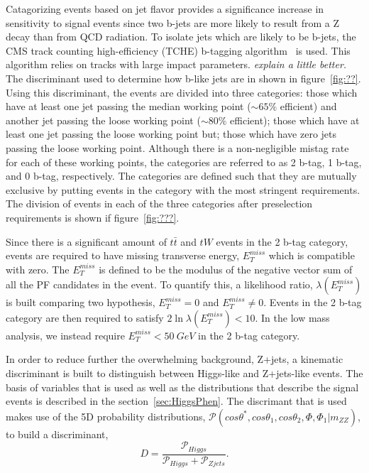 Catagorizing events based on jet flavor provides a significance 
increase in sensitivity to signal events since two b-jets are 
more likely to result from a Z decay than from QCD radiation.  
To isolate jets which are likely to be b-jets, the CMS track 
counting high-efficiency (TCHE) b-tagging algorithm~\cite{???} 
is used.  This algorithm relies on tracks with large impact 
parameters. {\it explain a little better.} The discriminant used
to determine how b-like jets are in shown in figure~\ref{fig:??}.
Using this discriminant, the events are divided into three
categories: those which have at least one jet passing the median 
working point ($\sim65\%$ efficient) and another jet passing the
loose working point ($\sim80\%$ efficient); those which have at 
least one jet passing the loose working point but; those which 
have zero jets passing the loose working point.  Although there 
is a non-negligible mistag rate for each of these working points, 
the categories are referred to as 2 b-tag, 1 b-tag, and 
0 b-tag, respectively. The categories are defined such that 
they are mutually exclusive by putting events in the category 
with the most stringent requirements.  The division of events
in each of the three categories after preselection requirements
is shown if figure~\ref{fig:???}.

Since there is a significant amount of $t\bar{t}$ and $tW$ 
events in the 2 b-tag category, events are required to have
missing transverse energy, $E_T^{miss}$ which is compatible with 
zero.  The $E_T^{miss}$ is defined to be the modulus of the 
negative vector sum of all the PF candidates in the event.  
To quantify this, a likelihood ratio, $\lambda(E_T^{miss})$ 
is built comparing two hypothesis, $E_T^{miss}=0$ and 
$E_T^{miss}\neq 0$.  Events in the 2 b-tag category are then 
required to satisfy $2\ln\lambda(E_T^{miss})<10$.  In the 
low mass analysis, we instead require $E_T^{miss}<50~GeV$ in
the 2 b-tag category.    

In order to reduce further the overwhelming background, Z+jets,
a kinematic discriminant is built to distinguish between
Higgs-like and Z+jets-like events.  The basis of variables 
that is used as well as the distributions that describe the 
signal events is described in the section~\ref{sec:HiggsPhen}.
The discrimant that is used makes use of the 5D probability 
distributions, 
$\mathscr{P}(cos\theta^*,cos\theta_1,cos\theta_2,\Phi,\Phi_1|m_{ZZ})$,
to build a discriminant,
\begin{equation}
D = \frac{\mathscr{P}_{Higgs}}{\mathscr{P}_{Higgs}+\mathscr{P}_{Zjets}}.
\label{eq:KD}
\end{equation}

